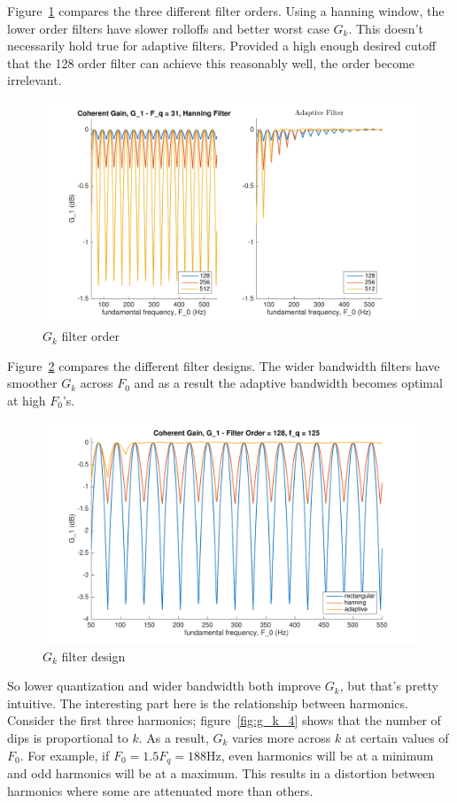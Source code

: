 \documentclass [11pt, proquest,oneside] {ganter_thesis}[2015/03/03]
\begin{document}
Figure~\ref{fig:g_k_2} compares the three different filter orders.  Using a hanning window, the lower order filters have slower rolloffs and better worst case $G_k$.  This doesn't necessarily hold true for adaptive filters.  Provided a high enough desired cutoff that the 128 order filter can achieve this reasonably well, the order become irrelevant.

\begin{figure}[!ht]
  \centering
    \includegraphics[width=.8\textwidth]{g_k_2}   
    \caption{$G_k$ filter order}\label{fig:g_k_2}
\end{figure}

Figure~\ref{fig:g_k_3} compares the different filter designs.  The wider bandwidth filters have smoother $G_k$ across $F_0$ and as a result the adaptive bandwidth becomes optimal at high $F_0$'s.

\begin{figure}[!ht]
  \centering
    \includegraphics[width=.8\textwidth]{g_k_3}   
    \caption{$G_k$ filter design}\label{fig:g_k_3}
\end{figure}

So lower quantization and wider bandwidth both improve $G_k$, but that's pretty intuitive.  The interesting part here is the relationship between harmonics.  Consider the first three harmonics;  figure~\ref{fig:g_k_4} shows that the number of dips is proportional to $k$.  As a result, $G_k$ varies more across $k$ at certain values of $F_0$.  For example, if $F_0 = 1.5F_q = 188$Hz, even harmonics will be at a minimum and odd harmonics will be at a maximum.  This results in a distortion between harmonics where some are attenuated more than others.
\end{document}
